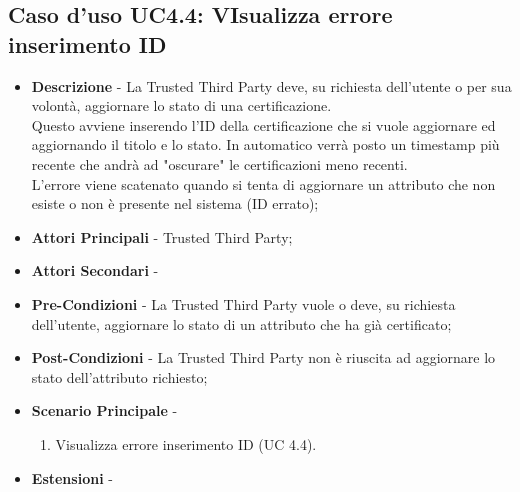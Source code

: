 \subsection{Caso d'uso UC4.4: VIsualizza errore inserimento ID}
\begin{itemize}
	\item \textbf{Descrizione} - La Trusted Third Party deve, su richiesta dell'utente o per sua volontà, aggiornare lo stato di una certificazione.\\
	Questo avviene inserendo l'ID della certificazione che si vuole aggiornare ed aggiornando il titolo e lo stato. In automatico verrà posto un timestamp più recente che andrà ad "oscurare" le certificazioni meno recenti.\\
	L'errore viene scatenato quando si tenta di aggiornare un attributo che non esiste o non è presente nel sistema (ID errato);
	\item \textbf{Attori Principali} - Trusted Third Party;
	\item \textbf{Attori Secondari} -
	\item \textbf{Pre-Condizioni} - La Trusted Third Party vuole o deve, su richiesta dell'utente, aggiornare lo stato di un attributo che ha già certificato;
	\item \textbf{Post-Condizioni} - La Trusted Third Party non è riuscita ad aggiornare lo stato dell'attributo richiesto;
	\item \textbf{Scenario Principale} -
	\begin{enumerate}
		\item Visualizza errore inserimento ID (UC 4.4).
	\end{enumerate}
	\item \textbf{Estensioni} -
\end{itemize}
